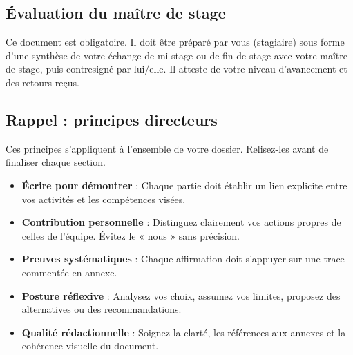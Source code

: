 \subsection{Évaluation du maître de stage}

\begin{guideline}
Ce document est obligatoire. Il doit être préparé par vous (stagiaire) sous forme d'une synthèse de votre échange de mi-stage ou de fin de stage avec votre maître de stage, puis contresigné par lui/elle. Il atteste de votre niveau d'avancement et des retours reçus.
\end{guideline}



\newpage
\subsection*{Rappel : principes directeurs}

\begin{guideline}
Ces principes s'appliquent à l'ensemble de votre dossier. Relisez-les avant de finaliser chaque section.
\end{guideline}

\begin{itemize}
    \item \textbf{Écrire pour démontrer} : Chaque partie doit établir un lien explicite entre vos activités et les compétences visées.
    \item \textbf{Contribution personnelle} : Distinguez clairement vos actions propres de celles de l'équipe. Évitez le « nous » sans précision.
    \item \textbf{Preuves systématiques} : Chaque affirmation doit s'appuyer sur une trace commentée en annexe.
    \item \textbf{Posture réflexive} : Analysez vos choix, assumez vos limites, proposez des alternatives ou des recommandations.
    \item \textbf{Qualité rédactionnelle} : Soignez la clarté, les références aux annexes et la cohérence visuelle du document.
\end{itemize}

\vspace{1cm}
\begin{center}
\end{center}

